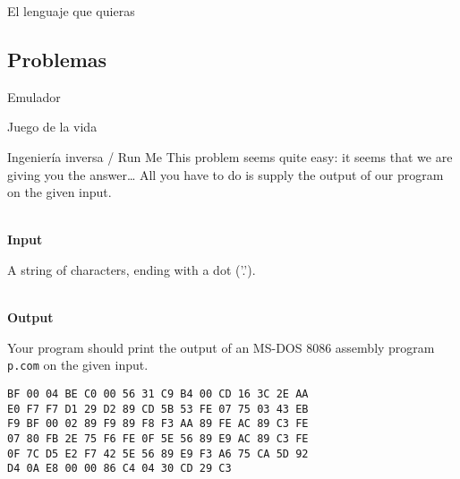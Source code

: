 \begin{frame}{El lenguaje que quieras}
\end{frame}

\subsection{Problemas}
\begin{frame}{Emulador}

\end{frame}

\begin{frame}{Juego de la vida}

\end{frame}

\begin{frame}[fragile]{Ingeniería inversa / Run Me}
    This problem seems quite easy: it seems that we are giving you the answer…
    All you have to do is supply the output of our program on the given input. \\~
    
    \textbf{Input}

    A string of characters, ending with a dot ('.'). \\~
    
    \textbf{Output}

    Your program should print the output of an MS-DOS 8086 assembly program
    \texttt{p.com} on the given input.
    
    \begin{lstlisting}
BF 00 04 BE C0 00 56 31 C9 B4 00 CD 16 3C 2E AA
E0 F7 F7 D1 29 D2 89 CD 5B 53 FE 07 75 03 43 EB
F9 BF 00 02 89 F9 89 F8 F3 AA 89 FE AC 89 C3 FE
07 80 FB 2E 75 F6 FE 0F 5E 56 89 E9 AC 89 C3 FE
0F 7C D5 E2 F7 42 5E 56 89 E9 F3 A6 75 CA 5D 92
D4 0A E8 00 00 86 C4 04 30 CD 29 C3
    \end{lstlisting}
\end{frame}

